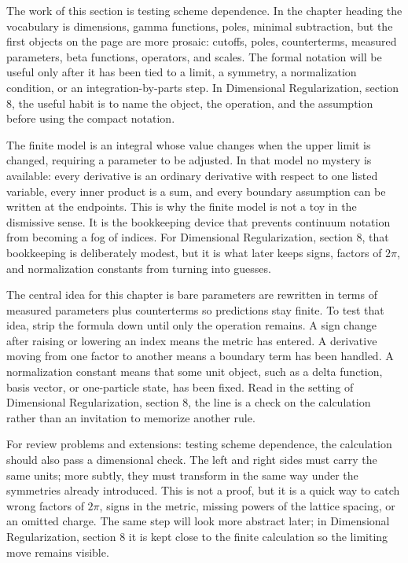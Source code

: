 The work of this section is testing scheme dependence.  In the chapter heading the vocabulary is dimensions, gamma functions, poles, minimal subtraction, but the first objects on the page are more prosaic: cutoffs, poles, counterterms, measured parameters, beta functions, operators, and scales.  The formal notation will be useful only after it has been tied to a limit, a symmetry, a normalization condition, or an integration-by-parts step.  In Dimensional Regularization, section 8, the useful habit is to name the object, the operation, and the assumption before using the compact notation.

The finite model is an integral whose value changes when the upper limit is changed, requiring a parameter to be adjusted.  In that model no mystery is available: every derivative is an ordinary derivative with respect to one listed variable, every inner product is a sum, and every boundary assumption can be written at the endpoints.  This is why the finite model is not a toy in the dismissive sense.  It is the bookkeeping device that prevents continuum notation from becoming a fog of indices.  For Dimensional Regularization, section 8, that bookkeeping is deliberately modest, but it is what later keeps signs, factors of \(2\pi\), and normalization constants from turning into guesses.

The central idea for this chapter is bare parameters are rewritten in terms of measured parameters plus counterterms so predictions stay finite.  To test that idea, strip the formula down until only the operation remains.  A sign change after raising or lowering an index means the metric has entered.  A derivative moving from one factor to another means a boundary term has been handled.  A normalization constant means that some unit object, such as a delta function, basis vector, or one-particle state, has been fixed.  Read in the setting of Dimensional Regularization, section 8, the line is a check on the calculation rather than an invitation to memorize another rule.

For review problems and extensions: testing scheme dependence, the calculation should also pass a dimensional check.  The left and right sides must carry the same units; more subtly, they must transform in the same way under the symmetries already introduced.  This is not a proof, but it is a quick way to catch wrong factors of \(2\pi\), signs in the metric, missing powers of the lattice spacing, or an omitted charge.  The same step will look more abstract later; in Dimensional Regularization, section 8 it is kept close to the finite calculation so the limiting move remains visible.

